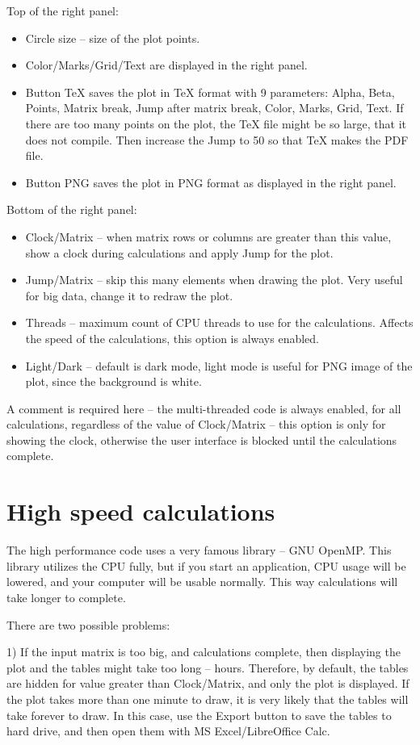 \documentclass[11pt, a4paper]{article}
\begin{document}
Top of the right panel:
\begin{itemize}
\item Circle size -- size of the plot points.
\item Color/Marks/Grid/Text are displayed in the right panel.
\item Button TeX saves the plot in TeX format with 9 parameters:
Alpha, Beta, Points, Matrix break, Jump after matrix break, Color, Marks, Grid, Text.
If there are too many points on the plot, the TeX file might be so large, that it does not compile.
Then increase the Jump to 50 so that TeX makes the PDF file.
\item Button PNG saves the plot in PNG format as displayed in the right panel.
\end{itemize}
Bottom of the right panel:
\begin{itemize}
\item Clock/Matrix -- when matrix rows or columns are greater than this value, show a clock during calculations and apply Jump for the plot.
\item Jump/Matrix -- skip this many elements when drawing the plot. Very useful for big data, change it to redraw the plot.
\item Threads -- maximum count of CPU threads to use for the calculations. Affects the speed of the calculations, this option is always enabled.
\item Light/Dark -- default is dark mode, light mode is useful for PNG image of the plot, since the background is white.
\end{itemize}

A comment is required here -- the multi-threaded code is always enabled, for all calculations, regardless of the value of Clock/Matrix --
this option is only for showing the clock, otherwise the user interface is blocked until the calculations complete.


\section{High speed calculations}

The high performance code uses a very famous library -- GNU OpenMP. This library utilizes the CPU fully,
but if you start an application, CPU usage will be lowered, and your computer will be usable normally.
This way calculations will take longer to complete.

There are two possible problems:

1) If the input matrix is too big, and calculations complete, then displaying the plot and the tables might take too long -- hours.
Therefore, by default, the tables are hidden for value greater than Clock/Matrix, and only the plot is displayed.
If the plot takes more than one minute to draw, it is very likely that the tables will take forever to draw.
In this case, use the Export button to save the tables to hard drive, and then open them with MS Excel/LibreOffice Calc.
\end{document}
